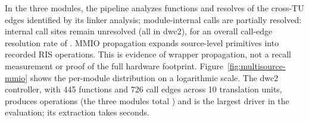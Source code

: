 \begin{table}[t]
\centering
\caption{Multi-source results. TUs = translation units, LoC = source lines,
Funcs = functions analyzed, X-TU = resolved cross-TU call edges,
Prop = propagated MMIO edges, Src MMIO = source-level MMIO primitives,
RIS MMIO = propagated RIS MMIO operations, H/B/L = backend compilation.}
\label{tab:multisource}
\resizebox{\columnwidth}{!}{\MultiSourceResultsTable}
\end{table}

In the three modules, the pipeline analyzes \MultiSourceFunctions{}
functions and resolves \MultiSourceResolvedCrossTUEdges{} of the
\MultiSourceCrossTUEdges{} cross-TU edges identified by its linker analysis;
module-internal calls are partially resolved: \MultiSourceUnresolvedCalls{}
internal call sites remain unresolved (all in dwc2), for an overall call-edge
resolution rate of \MultiSourceCallResolutionPct{}. MMIO propagation expands
\MultiSourceSourceMMIO{} source-level primitives into
\MultiSourceRISMMIO{} recorded RIS operations. This is evidence of wrapper
propagation, not a recall measurement or proof of the full hardware footprint.
Figure~\ref{fig:multisource-mmio} shows the per-module distribution on a
logarithmic scale.
The dwc2 controller, with 445 functions and 726 call edges across 10
translation units, produces \MultiSourceDwcTwoOps{} operations (the three
modules total \MultiSourceOps{}) and is the largest driver in the evaluation;
its extraction takes \MultiSourceDwcTwoSeconds{} seconds.

